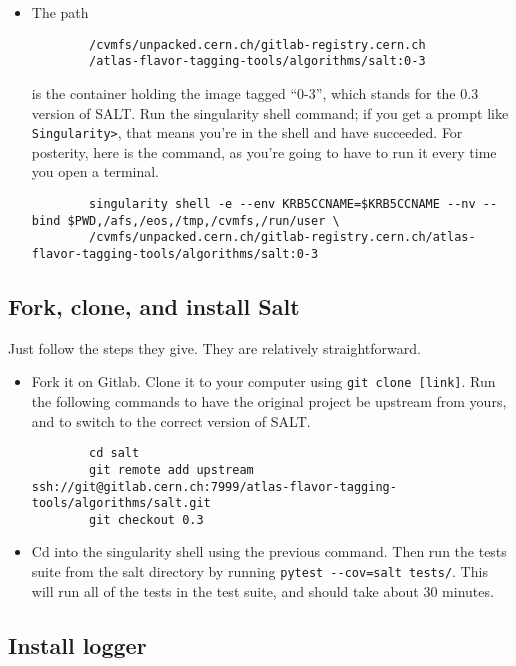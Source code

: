 \documentclass[11pt]{article}
\begin{document}
\begin{itemize}
    \item The path
    \begin{verbatim}
        /cvmfs/unpacked.cern.ch/gitlab-registry.cern.ch
        /atlas-flavor-tagging-tools/algorithms/salt:0-3
    \end{verbatim}
    is the container holding the image tagged ``0-3'', which
    stands for the $0.3$ version of SALT. Run the singularity shell
    command; if you get a prompt like \verb|Singularity>|,
    that means you're in the shell and have succeeded.
    For posterity, here is the command, as you're going to have to
    run it every time you open a terminal.
    \begin{verbatim}
        singularity shell -e --env KRB5CCNAME=$KRB5CCNAME --nv --bind $PWD,/afs,/eos,/tmp,/cvmfs,/run/user \
        /cvmfs/unpacked.cern.ch/gitlab-registry.cern.ch/atlas-flavor-tagging-tools/algorithms/salt:0-3
    \end{verbatim}
\end{itemize}

\subsection{Fork, clone, and install Salt}

Just follow the steps they give. They are relatively
straightforward.

\begin{itemize}
    \item Fork it on Gitlab. Clone it to your computer
    using \verb|git clone [link]|. Run the following
    commands to have the original project be upstream
    from yours, and to switch to the correct version
    of SALT.
    \begin{verbatim}
        cd salt
        git remote add upstream ssh://git@gitlab.cern.ch:7999/atlas-flavor-tagging-tools/algorithms/salt.git
        git checkout 0.3
    \end{verbatim}
    \item Cd into the singularity shell using the previous command. 
    Then run the tests suite from the salt directory by running 
    \verb|pytest --cov=salt tests/|. This will run all of the tests in the 
    test suite, and should take about 30 minutes.
\end{itemize}

\subsection{Install logger}
\end{document}
